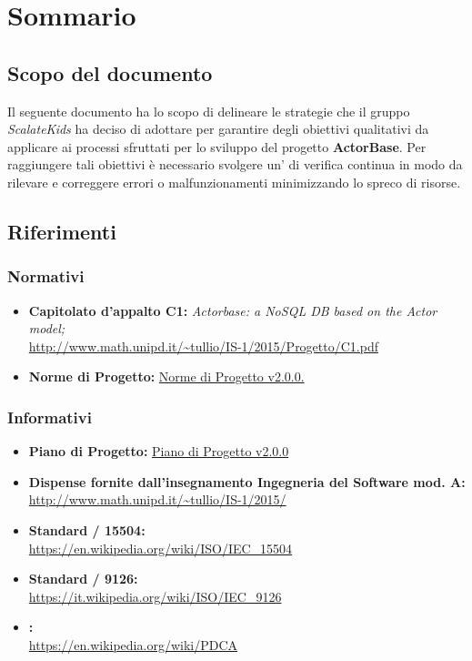 \documentclass{scalatekids-article}
\begin{document}
\section{Sommario}
\subsection{Scopo del documento}
Il seguente documento ha lo scopo di delineare le strategie che il gruppo \textit{ScalateKids} ha deciso di adottare per garantire degli obiettivi qualitativi da applicare ai processi sfruttati per lo sviluppo del progetto \textbf{ActorBase}. Per raggiungere tali obiettivi è necessario svolgere un' di verifica continua in modo da rilevare e correggere errori o malfunzionamenti minimizzando lo spreco di risorse.
\prodPurpose
\glossExpl
\subsection{Riferimenti}
\subsubsection{Normativi}
\begin{itemize}
\item\textbf{Capitolato d'appalto C1:} \textit{Actorbase: a NoSQL DB based on the Actor model;}\\
  \url{http://www.math.unipd.it/~tullio/IS-1/2015/Progetto/C1.pdf}
\item\textbf{Norme di Progetto:} \href{run:../Interni/NormeDiProgetto\_v2.0.0.pdf}{Norme di Progetto v2.0.0.}
\end{itemize}
\subsubsection{Informativi}
\begin{itemize}
\item\textbf{Piano di Progetto:} \href{run:./PianoDiProgetto\_v2.0.0.pdf}{Piano di Progetto v2.0.0}
\item\textbf{Dispense fornite dall'insegnamento Ingegneria del Software mod. A:}\\
  \url{http://www.math.unipd.it/~tullio/IS-1/2015/}
\item\textbf{Standard / 15504:}\\
\url{https://en.wikipedia.org/wiki/ISO/IEC_15504}
\item\textbf{Standard / 9126:}\\
\url{https://it.wikipedia.org/wiki/ISO/IEC_9126}
\item\textbf{:}\\
\url{https://en.wikipedia.org/wiki/PDCA}
\end{itemize}
\newpage
\end{document}
